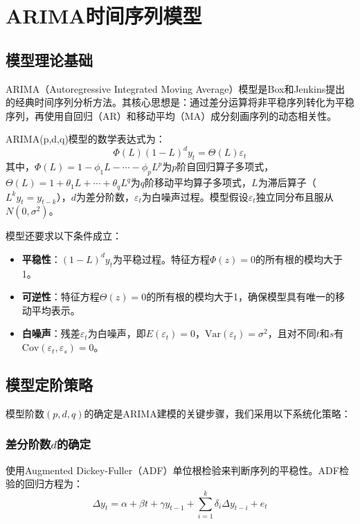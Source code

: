 \documentclass[12pt,a4paper]{article}
\begin{document}
\section{ARIMA时间序列模型}

\subsection{模型理论基础}

ARIMA（Autoregressive Integrated Moving Average）模型是Box和Jenkins\cite{box2015}提出的经典时间序列分析方法。其核心思想是：通过差分运算将非平稳序列转化为平稳序列，再使用自回归（AR）和移动平均（MA）成分刻画序列的动态相关性。

ARIMA(p,d,q)模型的数学表达式为：
\begin{equation}
\label{eq:arima}
\Phi(L)(1-L)^d y_t = \Theta(L)\varepsilon_t
\end{equation}
其中，$\Phi(L)=1-\phi_1 L-\cdots-\phi_p L^p$为$p$阶自回归算子多项式，$\Theta(L)=1+\theta_1 L+\cdots+\theta_q L^q$为$q$阶移动平均算子多项式，$L$为滞后算子（$L^k y_t = y_{t-k}$），$d$为差分阶数，$\varepsilon_t$为白噪声过程。模型假设$\varepsilon_t$独立同分布且服从$N(0,\sigma^2)$。

模型还要求以下条件成立：
\begin{itemize}
  \item \textbf{平稳性}：$(1-L)^d y_t$为平稳过程。特征方程$\Phi(z)=0$的所有根的模均大于1。
  \item \textbf{可逆性}：特征方程$\Theta(z)=0$的所有根的模均大于1，确保模型具有唯一的移动平均表示。
  \item \textbf{白噪声}：残差$\varepsilon_t$为白噪声，即$E(\varepsilon_t)=0$，$\text{Var}(\varepsilon_t)=\sigma^2$，且对不同$t$和$s$有$\text{Cov}(\varepsilon_t,\varepsilon_s)=0$。
\end{itemize}

\subsection{模型定阶策略}

模型阶数$(p,d,q)$的确定是ARIMA建模的关键步骤，我们采用以下系统化策略：

\subsubsection{差分阶数$d$的确定}

使用Augmented Dickey-Fuller（ADF）单位根检验来判断序列的平稳性。ADF检验的回归方程为：
\begin{equation}
\Delta y_t = \alpha + \beta t + \gamma y_{t-1} + \sum_{i=1}^{k} \delta_i \Delta y_{t-i} + e_t
\end{equation}
\end{document}
